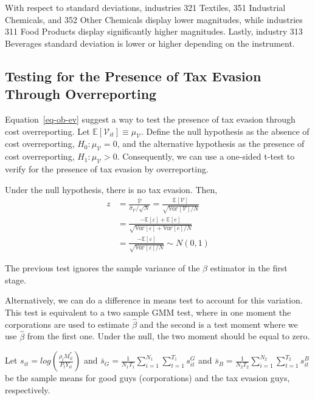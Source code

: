 \documentclass[
  12pt]{article}
\theoremstyle{definition}
\theoremstyle{remark}
\begin{document}
With respect to standard deviations, industries 321 Textiles, 351
Industrial Chemicals, and 352 Other Chemicals display lower magnitudes,
while industries 311 Food Products display significantly higher
magnitudes. Lastly, industry 313 Beverages standard deviation is lower
or higher depending on the instrument.

\subsection{Testing for the Presence of Tax Evasion Through
Overreporting}\label{sec-tax-ev-test}

Equation~\ref{eq-ob-ev} suggest a way to test the presence of tax
evasion through cost overreporting. Let
\(\mathbb{E}[\mathcal{V}_{it}]\equiv \mu_{\mathcal{V}}\). Define the
null hypothesis as the absence of cost overreporting,
\(H_0: \mu_{\mathcal{V}}=0\), and the alternative hypothesis as the
presence of cost overreporting, \(H_1: \mu_{\mathcal{V}}>0\).
Consequently, we can use a one-sided t-test to verify for the presence
of tax evasion by overreporting.

Under the null hypothesis, there is no tax evasion. Then, \[
\begin{aligned}  
  z &= \frac{\bar{\mathcal{V}}}{\hat\sigma_{\mathcal{V}}/\sqrt{N}}=\frac{\mathbb{E}[\mathcal{V}]}{\sqrt{\mathbb{Var}[\mathcal{V}]/N}}\\
  &=\frac{-\mathbb{E}[\varepsilon]+\mathbb{E}[e]}{\sqrt{\mathbb{Var}[\varepsilon]+\mathbb{Var}[e]/N}}\\
  &= \frac{-\mathbb{E}[\varepsilon]}{\sqrt{\mathbb{Var}[\varepsilon]/N}}\sim N(0,1)
\end{aligned}
\]

The previous test ignores the sample variance of the \(\beta\) estimator
in the first stage.

Alternatively, we can do a difference in means test to account for this
variation. This test is equivalent to a two sample GMM test, where in
one moment the corporations are used to estimate \(\hat\beta\) and the
second is a test moment where we use \(\hat\beta\) from the first one.
Under the null, the two moment should be equal to zero.

Let \(s_{it}=log\left(\frac{\rho_t M^*_{it}}{P_t Y_{it}}\right)\) and
\(\bar s_G= \frac{1}{N_1T_1}\sum_{i=1}^{N_1}\sum_{t=1}^{T_1}s_{it}^G\)
and
\(\bar s_B= \frac{1}{N_2T_2}\sum_{i=1}^{N_2}\sum_{t=1}^{T_2}s_{it}^B\)
be the sample means for good guys (corporations) and the tax evasion
guys, respectively.
\end{document}
